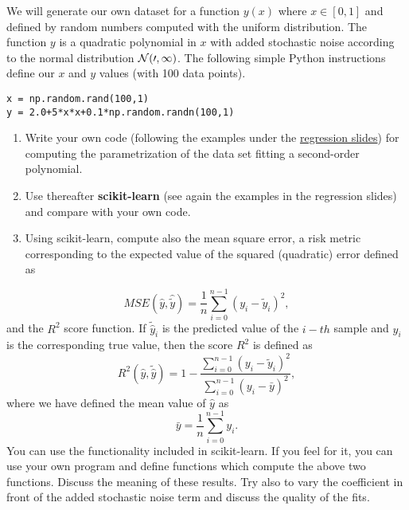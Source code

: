 \documentclass[%
oneside,                 %
final,                   %
10pt]{article}
\newenvironment{doconceexercise}{}{}
\newcounter{doconceexercisecounter}
\begin{document}
\begin{doconceexercise}



We will generate our own dataset for a function $y(x)$ where $x \in [0,1]$ and defined by random numbers computed with the uniform distribution. The function $y$ is a quadratic polynomial in $x$ with added stochastic noise according to the normal distribution $\cal {N}(0,1)$.
The following simple Python instructions define our $x$ and $y$ values (with 100 data points).
\begin{verbatim}
x = np.random.rand(100,1)
y = 2.0+5*x*x+0.1*np.random.randn(100,1)
\end{verbatim}

\begin{enumerate}
\item Write your own code (following the examples under the \href{{https://compphysics.github.io/MachineLearningECT/doc/pub/Day1/html/Day1-bs.html}}{regression slides}) for computing the parametrization of the data set fitting a second-order polynomial. 

\item Use thereafter \textbf{scikit-learn} (see again the examples in the regression slides) and compare with your own code.   

\item Using scikit-learn, compute also the mean square error, a risk metric corresponding to the expected value of the squared (quadratic) error defined as
\end{enumerate}

\noindent
\[ MSE(\hat{y},\hat{\tilde{y}}) = \frac{1}{n}
\sum_{i=0}^{n-1}(y_i-\tilde{y}_i)^2, 
\] 
and the $R^2$ score function.
If $\tilde{\hat{y}}_i$ is the predicted value of the $i-th$ sample and $y_i$ is the corresponding true value, then the score $R^2$ is defined as
\[
R^2(\hat{y}, \tilde{\hat{y}}) = 1 - \frac{\sum_{i=0}^{n - 1} (y_i - \tilde{y}_i)^2}{\sum_{i=0}^{n - 1} (y_i - \bar{y})^2},
\]
where we have defined the mean value  of $\hat{y}$ as
\[
\bar{y} =  \frac{1}{n} \sum_{i=0}^{n - 1} y_i.
\]
You can use the functionality included in scikit-learn. If you feel for it, you can use your own program and define functions which compute the above two functions. 
Discuss the meaning of these results. Try also to vary the coefficient in front of the added stochastic noise term and discuss the quality of the fits.



\end{doconceexercise}
\end{document}
